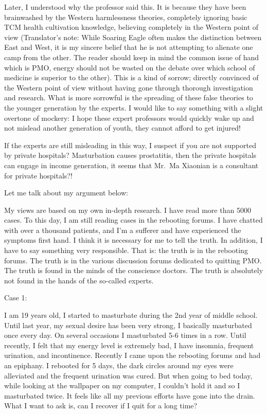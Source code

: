\documentclass[
]{book}
\begin{document}
Later, I understood why the professor said this. It is because they have been brainwashed by the Western harmlessness theories, completely ignoring basic TCM health cultivation knowledge, believing completely in the Western point of view (Translator's note: While Soaring Eagle often makes the distinction between East and West, it is my sincere belief that he is not attempting to alienate one camp from the other. The reader should keep in mind the common issue of hand which is PMO, energy should not be wasted on the debate over which school of medicine is superior to the other). This is a kind of sorrow; directly convinced of the Western point of view without having gone through thorough investigation and research. What is more sorrowful is the spreading of these false theories to the younger generation by the experts. I would like to say something with a slight overtone of mockery: I hope these expert professors would quickly wake up and not mislead another generation of youth, they cannot afford to get injured!

If the experts are still misleading in this way, I suspect if you are not supported by private hospitals? Masturbation causes prostatitis, then the private hospitals can engage in income generation, it seems that Mr.~Ma Xiaonian is a consultant for private hospitals?!

Let me talk about my argument below:

My views are based on my own in-depth research. I have read more than 5000 cases. To this day, I am still reading cases in the rebooting forums. I have chatted with over a thousand patients, and I'm a sufferer and have experienced the symptoms first hand. I think it is necessary for me to tell the truth. In addition, I have to say something very responsible. That is: the truth is in the rebooting forums. The truth is in the various discussion forums dedicated to quitting PMO. The truth is found in the minds of the conscience doctors. The truth is absolutely not found in the hands of the so-called experts.

Case 1:

I am 19 years old, I started to masturbate during the 2nd year of middle school. Until last year, my sexual desire has been very strong, I basically masturbated once every day. On several occasions I masturbated 5-6 times in a row. Until recently, I felt that my energy level is extremely bad, I have insomnia, frequent urination, and incontinence. Recently I came upon the rebooting forums and had an epiphany. I rebooted for 5 days, the dark circles around my eyes were alleviated and the frequent urination was cured. But when going to bed today, while looking at the wallpaper on my computer, I couldn't hold it and so I masturbated twice. It feels like all my previous efforts have gone into the drain. What I want to ask is, can I recover if I quit for a long time?
\end{document}
